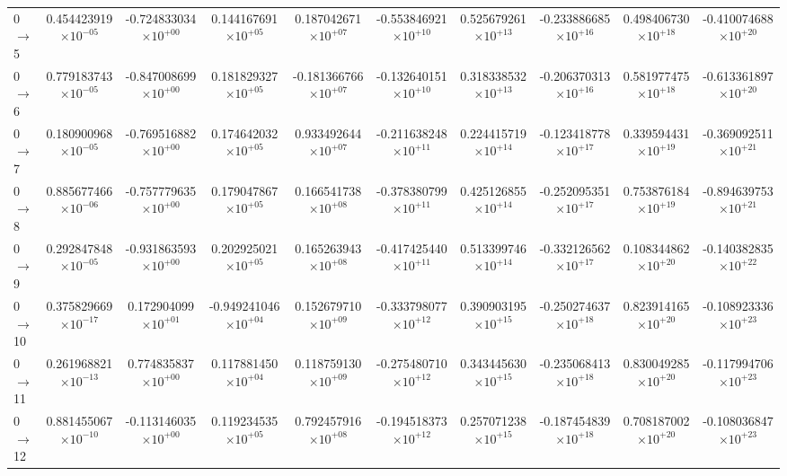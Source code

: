 \documentclass[reviewcopy]{elsarticle}
\begin{document}
\begin{landscape}
\begin{longtable}{lccccccccc}
0 $\to$  5  & 0.454423919$\times10^{-05}$  & -0.724833034$\times10^{+00}$  & 0.144167691$\times10^{+05}$  & 0.187042671$\times10^{+07}$  & -0.553846921$\times10^{+10}$  & 0.525679261$\times10^{+13}$  & -0.233886685$\times10^{+16}$  & 0.498406730$\times10^{+18}$  & -0.410074688$\times10^{+20}$ \\
 0 $\to$ 6  & 0.779183743$\times10^{-05}$  & -0.847008699$\times10^{+00}$  & 0.181829327$\times10^{+05}$  & -0.181366766$\times10^{+07}$  & -0.132640151$\times10^{+10}$  & 0.318338532$\times10^{+13}$  & -0.206370313$\times10^{+16}$  & 0.581977475$\times10^{+18}$  & -0.613361897$\times10^{+20}$ \\
 0 $\to$ 7  & 0.180900968$\times10^{-05}$  & -0.769516882$\times10^{+00}$  & 0.174642032$\times10^{+05}$  & 0.933492644$\times10^{+07}$  & -0.211638248$\times10^{+11}$  & 0.224415719$\times10^{+14}$  & -0.123418778$\times10^{+17}$  & 0.339594431$\times10^{+19}$  & -0.369092511$\times10^{+21}$ \\
0 $\to$  8  & 0.885677466$\times10^{-06}$  & -0.757779635$\times10^{+00}$  & 0.179047867$\times10^{+05}$  & 0.166541738$\times10^{+08}$  & -0.378380799$\times10^{+11}$  & 0.425126855$\times10^{+14}$  & -0.252095351$\times10^{+17}$  & 0.753876184$\times10^{+19}$  & -0.894639753$\times10^{+21}$ \\
0 $\to$  9  & 0.292847848$\times10^{-05}$  & -0.931863593$\times10^{+00}$  & 0.202925021$\times10^{+05}$  & 0.165263943$\times10^{+08}$  & -0.417425440$\times10^{+11}$  & 0.513399746$\times10^{+14}$  & -0.332126562$\times10^{+17}$  & 0.108344862$\times10^{+20}$  & -0.140382835$\times10^{+22}$ \\
0 $\to$ 10  & 0.375829669$\times10^{-17}$  & 0.172904099$\times10^{+01}$  & -0.949241046$\times10^{+04}$  & 0.152679710$\times10^{+09}$  & -0.333798077$\times10^{+12}$  & 0.390903195$\times10^{+15}$  & -0.250274637$\times10^{+18}$  & 0.823914165$\times10^{+20}$  & -0.108923336$\times10^{+23}$ \\
0 $\to$  11  & 0.261968821$\times10^{-13}$  & 0.774835837$\times10^{+00}$  & 0.117881450$\times10^{+04}$  & 0.118759130$\times10^{+09}$  & -0.275480710$\times10^{+12}$  & 0.343445630$\times10^{+15}$  & -0.235068413$\times10^{+18}$  & 0.830049285$\times10^{+20}$  & -0.117994706$\times10^{+23}$ \\
0 $\to$  12  & 0.881455067$\times10^{-10}$  & -0.113146035$\times10^{+00}$  & 0.119234535$\times10^{+05}$  & 0.792457916$\times10^{+08}$  & -0.194518373$\times10^{+12}$  & 0.257071238$\times10^{+15}$  & -0.187454839$\times10^{+18}$  & 0.708187002$\times10^{+20}$  & -0.108036847$\times10^{+23}$ \\

\end{longtable}
\end{landscape}
\end{document}
